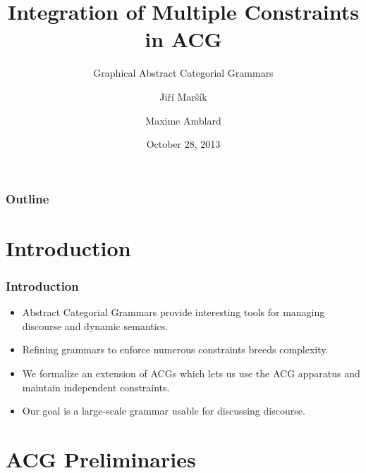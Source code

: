 \documentclass{beamer}
\begin{document}
\title[G-ACGs]{Integration of Multiple Constraints in ACG}
\subtitle{Graphical Abstract Categorial Grammars}
%
\author{Jiří Maršík \and Maxime Amblard}
%

\date[October 2013]{October 28, 2013}

\frame{\titlepage \setcounter{framenumber}{1}}

\begin{frame}
\frametitle{Outline}
\tableofcontents
\end{frame}

\section{Introduction}

\begin{frame}
  \frametitle{Introduction}

  \begin{itemize}
    \item Abstract Categorial Grammars provide interesting tools for managing
      discourse and dynamic semantics. \vfill
    \item Refining grammars to enforce numerous constraints breeds complexity.
      \vfill
    \item We formalize an extension of ACGs which lets us use the ACG
      apparatus and maintain independent constraints. \vfill
    \item Our goal is a large-scale grammar usable for discussing discourse.
  \end{itemize}
\end{frame}


\section{ACG Preliminaries}

\newcommand{\synt}[1]{C_{\textrm{#1}}}
\end{document}
